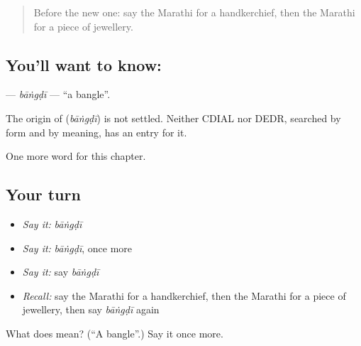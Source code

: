 \label{lesson:MR-C187-bangdi}



\begin{quote}
Before the new one: say the Marathi for a handkerchief, then the Marathi for a piece of jewellery.
\end{quote}

\subsection*{You'll want to know: }
\textbf{} — \emph{bāṅgḍī} — \textquotedblleft{}a bangle\textquotedblright{}.

\begin{cousinweb}
The origin of \textbf{} (\emph{bāṅgḍī}) is not settled. Neither CDIAL nor DEDR, searched by form and by meaning, has an entry for it.
\end{cousinweb}

\begin{grammarlens}[title={What you've built}]
One more word for this chapter.
\end{grammarlens}

\subsection*{Your turn}
\begin{itemize}
\raggedright
  \item \emph{Say it:} \emph{bāṅgḍī}
  \item \emph{Say it:} \emph{bāṅgḍī}, once more
  \item \emph{Say it:} say \emph{bāṅgḍī}
  \item \emph{Recall:} say the Marathi for a handkerchief, then the Marathi for a piece of jewellery, then say \emph{bāṅgḍī} again
\end{itemize}

\begin{tcolorbox}[breakable,colback=teal!4,colframe=teal!35!black,title={Before you move on}]
What does  mean? (\textquotedblleft{}A bangle\textquotedblright{}.) Say it once more.
\end{tcolorbox}
